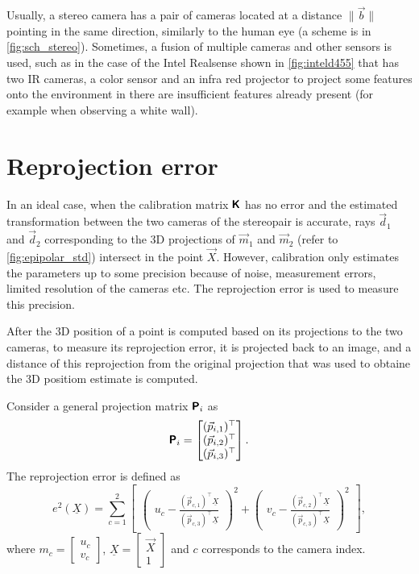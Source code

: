 Usually, a stereo camera has a pair of cameras located at a distance $\lVert \vec{b} \rVert$ pointing in the same direction, similarly to the human eye (a scheme is in \autoref{fig:sch_stereo}).
Sometimes, a fusion of multiple cameras and other sensors is used, such as in the case of the Intel Realsense shown in \autoref{fig:inteld455} that has two IR cameras, a color sensor and an infra red projector to project some features onto the environment in there are insufficient features already present (for example when observing a white wall).

\section{Reprojection error}
\label{sec:error_reprojection}
In an ideal case, when the calibration matrix $\pmb{\mathsf{K}}$ has no error and the estimated transformation between the two cameras of the stereopair is accurate, rays $\vec{d}_1$ and $\vec{d}_2$ corresponding to the 3D projections of $\vec{m}_1$ and $\vec{m}_2$ (refer to \autoref{fig:epipolar_std}) intersect in the point $\vec{X}$. 
However, calibration only estimates the parameters up to some precision because of noise, measurement errors, limited resolution of the cameras etc.
The reprojection error is used to measure this precision.

After the 3D position of a point is computed based on its projections to the two cameras, to measure its reprojection error, it is projected back to an image, and a distance of this reprojection from the original projection that was used to obtaine the 3D positiom estimate is computed.

Consider a general projection matrix $\pmb{\mathsf{P}}_i$ as
\begin{equation}
    \label{eq:p_general}
    \pmb{\mathsf{P}}_i = \begin{bmatrix} 
        (\vec{p}_{i, 1})^\top \\ 
        (\vec{p}_{i, 2})^\top \\ 
        (\vec{p}_{i, 3})^\top \end{bmatrix}.
\end{equation}
The reprojection error is defined as 
\begin{equation}
    e^2(\underline{X}) = \sum_{c=1}^{2}{  
    \begin{bmatrix}
        \begin{pmatrix}
            u_c - \frac{(\vec{p}_{c, 1})^\top \underline{X}}{(\vec{p}_{c, 3})^\top \underline{X}}
        \end{pmatrix}^2 + 
        \begin{pmatrix}
            v_c - \frac{(\vec{p}_{c, 2})^\top \underline{X}}{(\vec{p}_{c, 3})^\top \underline{X}}
        \end{pmatrix}^2
    \end{bmatrix}
    },
\end{equation}
where $m_c = \begin{bmatrix} u_c \\ v_c \end{bmatrix}$, $\underline{X} = \begin{bmatrix} \vec{X} \\ 1 \end{bmatrix}$ and $c$ corresponds to the camera index.
